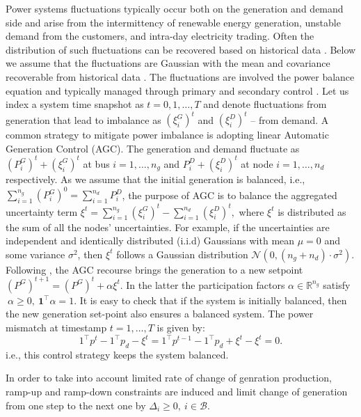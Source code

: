 Power systems fluctuations typically occur both on the generation and demand side and arise from the intermittency of renewable energy generation, unstable demand from the customers, and intra-day electricity trading. Often the distribution of such fluctuations can be recovered based on historical data \cite{roald2017chance,owen2019importance}. 
Below we assume that the fluctuations are Gaussian with the mean and covariance recoverable from historical data \cite{anvari2016short,roald2017chance}. 
The fluctuations are involved the power balance equation and typically managed through primary and secondary control \cite{machowski2020power}.
Let us index a system time snapshot as $t = 0, 1, \dots, T$ and denote fluctuations from generation that lead to imbalance as $(\xi_i^G)^t$ and $(\xi_i^D)^t$ -- from demand.
A common strategy to mitigate power imbalance is adopting linear Automatic Generation Control (AGC). The generation and demand fluctuate as $(P_i^G)^t + (\xi_i^G)^t$ at bus $i=1, \dots, n_g$ and $P^D_i + (\xi_i^D)^t$ at node $i=1,\dots, n_d$ respectively. As we assume that the initial generation is balanced, i.e., $\sum_{i=1}^{n_g} (P^G_i)^0 = \sum_{i=1}^{n_d} P_i^D$, the purpose of AGC is to balance the aggregated uncertainty term $\xi^t = \sum_{i=1}^{n_g}(\xi^G_i)^t-\sum_{i=1}^{n_d}(\xi^D_i)^t,$ where $\xi^t$ is distributed as the sum of all the nodes' uncertainties. For example, if the uncertainties are independent and identically distributed (i.i.d) Gaussians with mean $\mu = 0$ and some variance $\sigma^2$, then $\xi^t$ follows a Gaussian distribution $\mathcal{N}\left(0, (n_g+n_d) \cdot \sigma^2 \right)$. Following \cite{roald2017chance,baros2021examining,mezghani2020stochastic},
the AGC recourse brings the generation to a new setpoint $(P^G)^{t+1} = (P^G)^t + \alpha \xi^t$. In the latter the participation factors $\alpha \in \mathbb{R}^{n_g}$ satisfy $~\alpha \geq 0, ~ \boldsymbol{1}^\top \alpha = 1$. It is easy to check that if the system is initially balanced, then the new generation set-point also ensures a balanced system. The power mismatch at timestamp $t=1, \dots, T$ is given by:
$$
    1^\top p^t - 1^\top p_d - \xi^t = 1^\top p^{t-1} - 1^\top p_d + \xi^t - \xi^t = 0.
    \label{eq:power-balance-agc}
$$
i.e., this control strategy keeps the system balanced. 

In order to take into account limited rate of change of genration production, ramp-up and ramp-down constraints are induced and limit change of generation from one step to the next one by $\Delta_i \geq 0, ~ i \in \mathcal{B}$. 

